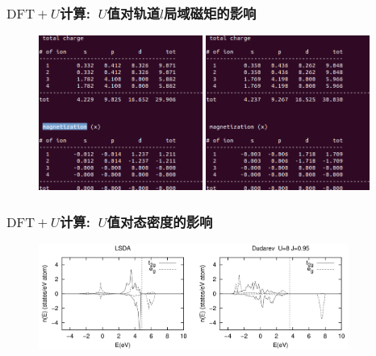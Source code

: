 \frame%
{
	\frametitle{$\mathrm{DFT}+U$计算:~$U$值对轨道$l$局域磁矩的影响}
\begin{figure}[h!]
\centering
\includegraphics[height=2.0in,viewport=0 0 410 415,clip]{Figures/NiO-LDA-magnetization.png}
\includegraphics[height=2.0in,viewport=0 0 410 415,clip]{Figures/NiO-LDA_U-magnetization.png}
\caption{\fontsize{6.2pt}{5.2pt}}%
\label{NiO-LDA_U-magnetization}
\end{figure}
}

\frame%
{
	\frametitle{$\mathrm{DFT}+U$计算:~$U$值对态密度的影响}
\begin{figure}[h!]
\centering
\includegraphics[width=4.0in,viewport=0 0 2010 680,clip]{Figures/NiO-LDA_U-DOS.png}
\caption{\fontsize{6.2pt}{5.2pt}}%
\label{NiO-LDA_U-DOS}
\end{figure}
}

